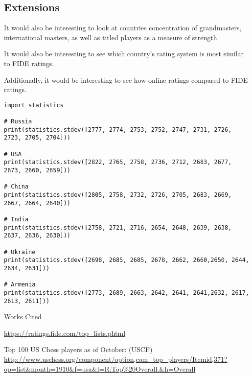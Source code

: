 \documentclass[12pt]{article}
\begin{document}
\subsection{Extensions}
It would also be interesting to look at countries concentration of grandmasters, international masters, as well as titled players as a measure of strength. 

It would also be interesting to see which country's rating system is most similar to FIDE ratings.

Additionally, it would be interesting to see how online ratings compared to FIDE ratings.

\newpage
\begin{verbatim}
import statistics

# Russia
print(statistics.stdev([2777, 2774, 2753, 2752, 2747, 2731, 2726, 2723, 2705, 2704]))

# USA
print(statistics.stdev([2822, 2765, 2758, 2736, 2712, 2683, 2677, 2673, 2660, 2659]))

# China
print(statistics.stdev([2805, 2758, 2732, 2726, 2705, 2683, 2669, 2667, 2664, 2640]))

# India 
print(statistics.stdev([2758, 2721, 2716, 2654, 2648, 2639, 2638, 2637, 2636, 2630])) 

# Ukraine
print(statistics.stdev([2698, 2685, 2685, 2678, 2662, 2660,2650, 2644, 2634, 2631]))

# Armenia
print(statistics.stdev([2773, 2689, 2663, 2642, 2641, 2641,2632, 2617, 2613, 2611]))
\end{verbatim}
\newpage
\begin{center}
Works Cited
\end{center}


\url{https://ratings.fide.com/top_lists.phtml}


Top 100 US Chess players as of October: (USCF)
\url{http://www.uschess.org/component/option,com_top_players/Itemid,371?op=list&month=1910&f=usa&l=R:Top%20Overall.&h=Overall}
\end{document}
